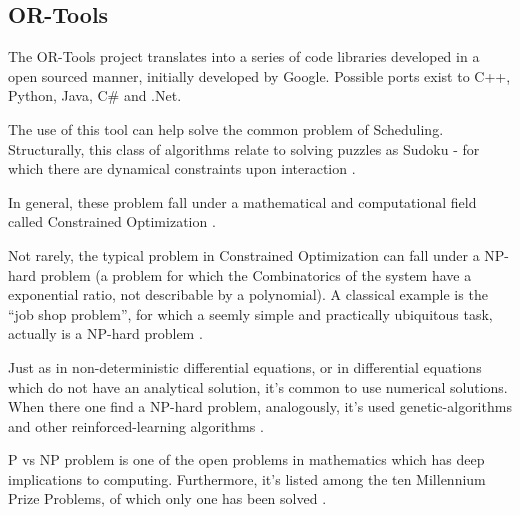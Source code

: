 \documentclass[
12pt,				%
openright,			%
oneside,			%
a4paper,			%
brazil,				%
english,			%
]{abntex2}
\begin{document}

\subsection{OR-Tools}
\label{sec:ortools}

The OR-Tools project translates into a series of code libraries
developed in a open sourced manner, initially developed by
Google. Possible ports exist to C++, Python, Java, C\# and .Net.  

The use of this tool can help solve the common problem of
Scheduling. Structurally, this class of algorithms relate to solving
puzzles as Sudoku - for which there are dynamical constraints upon
interaction \cite{simonis2005sudoku}. 

In general, these problem fall under a mathematical and computational
field called Constrained Optimization \cite{bertsekas2014constrained}. 

Not rarely, the typical problem in Constrained Optimization can fall
under a NP-hard problem (a problem for which the Combinatorics of the
system have a exponential ratio, not describable by a polynomial). A
classical example is the ``job shop problem'', for which a seemly
simple and practically ubiquitous task, actually is a NP-hard problem \cite{zhang2019review}.   

Just as in non-deterministic differential equations, or in
differential equations which do not have an analytical solution, it's
common to use numerical solutions. When there one find a NP-hard
problem, analogously, it's used genetic-algorithms and other
reinforced-learning algorithms \cite{zhang2019review}.  

P vs NP problem is one of the open problems in mathematics which has
deep implications to computing. Furthermore, it's listed among the ten
Millennium Prize Problems, of which only one has been solved \cite{cook2006p}.
\end{document}
